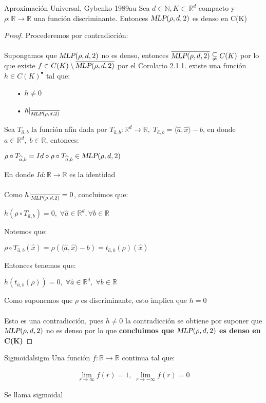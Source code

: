 \documentclass[12pt,a4paper]{book}
\providecommand{\inp}[1]{\langle#1\rangle}
\providecommand{\mlp}[1]{\textsl{MLP}(\rho,d,#1)}
\begin{document}
\begin{teorema}{Aproximación Universal, Gybenko 1989}{au}
Sea $d\in\mathbb{N},K\subset \mathbb{R}^{d}$ compacto y $\rho :\mathbb{R}\rightarrow \mathbb{R}$ una función discriminante. Entonces $\mlp{2}$ es denso en C(K)
\end{teorema}
\begin{proof}
Procederemos por contradicción:\\
\\
Supongamos que $\mlp{2}$ no es denso, entonces $\overline{\mlp{2}}\subsetneqq C(K)$ por lo que existe $f\in C(K)\setminus\overline{\mlp{2}}$ por el Corolario 2.1.1. existe una función $h\in C(K)^{\bullet}$ tal que:
\begin{enumerate}
\item[•] $h\neq 0$
\item[•] $h|_{\overline{\mlp{2}}}$
\end{enumerate} 
Sea $T_{\widehat{a},b}$ la función afín dada por $T_{\widehat{a},b}:\mathbb{R}^{d}\rightarrow\mathbb{R},\; T_{\widehat{a},b}=\inp{\widehat{a},\widehat{x}}-b$, en donde $a\in\mathbb{R}^{d},\; b\in\mathbb{R}$, entonces:
\begin{center}
$\rho \circ T_{\widehat{a},b}=Id\circ \rho\circ T_{\widehat{a},b}\in\mlp{2}$
\end{center}
En donde $Id:\mathbb{R}\rightarrow\mathbb{R}$ es la identidad\\
\\
Como $h|_{\overline{\mlp{2}}}=0$, concluimos que:
\begin{center}
$h(\rho\circ T_{\widehat{a},b})=0,\;\forall \widehat{a}\in\mathbb{R}^{d},\forall b\in\mathbb{R}$
\end{center}
Notemos que:
\begin{center}
$\rho\circ T_{\widehat{a},b}(\widehat{x})=\rho(\inp{\widehat{a},\widehat{x}}-b)=t_{\widehat{a},b}(\rho)(\widehat{x})$
\end{center}
Entonces tenemos que:
\begin{center}
$h(t_{\widehat{a},b}(\rho))=0,\;\forall \widehat{a}\in\mathbb{R}^{d},\;\forall b\in\mathbb{R}$
\end{center}
Como suponemos que $\rho$ es discriminante, esto implica que $h=0$\\
\\
Esto es una contradicción, pues $h\neq 0$ la contradicción se obtiene por suponer que $\mlp{2}$ no es denso por lo que \textbf{concluimos que $\mlp{2}$ es denso en C(K)}
\end{proof}
\begin{definicion}{Sigmoidal}{sigm}
Una función $f:\mathbb{R}\rightarrow\mathbb{R}$ continua tal que:

\begin{equation*}
\begin{split}
\lim_{r\rightarrow\infty}f(r)=1,\;\lim_{r\rightarrow -\infty}f(r)=0
\end{split}
\end{equation*}

Se llama sigmoidal
\end{definicion}
\end{document}
